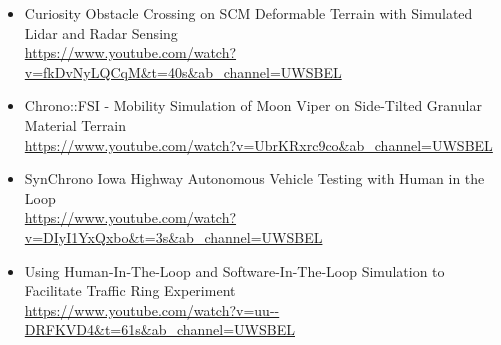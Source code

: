 



\begin{footnotesize}

\begin{itemize}[leftmargin=2ex, nosep, noitemsep]
	
	
	\item {Curiosity Obstacle Crossing on SCM Deformable Terrain with Simulated Lidar and Radar Sensing \\ \url{https://www.youtube.com/watch?v=fkDvNyLQCqM&t=40s&ab_channel=UWSBEL}}
	
	
	\item {Chrono::FSI - Mobility Simulation of Moon Viper on Side-Tilted Granular Material Terrain \\ \url{https://www.youtube.com/watch?v=UbrKRxrc9co&ab_channel=UWSBEL}}
	
	
	
	
	\item {SynChrono Iowa Highway Autonomous Vehicle Testing with Human in the Loop \\ \url{https://www.youtube.com/watch?v=DIyI1YxQxbo&t=3s&ab_channel=UWSBEL}}
	
	
	\item {Using Human-In-The-Loop and Software-In-The-Loop Simulation to Facilitate Traffic Ring Experiment \\ \url{https://www.youtube.com/watch?v=uu--DRFKVD4&t=61s&ab_channel=UWSBEL}}

\end{itemize}
	
\end{footnotesize}


